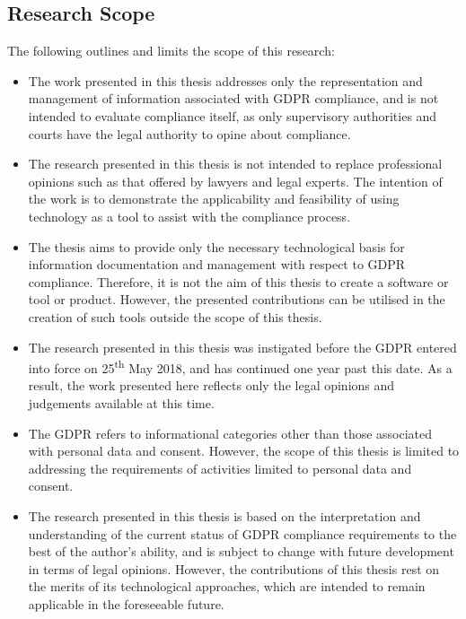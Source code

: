 \subsection{Research Scope}\label{sec:intro-scope}
The following outlines and limits the scope of this research:
\begin{itemize}
    \item The work presented in this thesis addresses only the representation and management of information associated with GDPR compliance, and is not intended to evaluate compliance itself, as only supervisory authorities and courts have the legal authority to opine about compliance.
    \item The research presented in this thesis is not intended to replace professional opinions such as that offered by lawyers and legal experts. The intention of the work is to demonstrate the applicability and feasibility of using technology as a tool to assist with the compliance process.
    \item The thesis aims to provide only the necessary technological basis for information documentation and management with respect to GDPR compliance. Therefore, it is not the aim of this thesis to create a software or tool or product. However, the presented contributions can be utilised in the creation of such tools outside the scope of this thesis.
    \item The research presented in this thesis was instigated before the GDPR entered into force on 25\textsuperscript{th} May 2018, and has continued one year past this date. As a result, the work presented here reflects only the legal opinions and judgements available at this time.
    \item The GDPR refers to informational categories other than those associated with personal data and consent. However, the scope of this thesis is limited to addressing the requirements of activities limited to personal data and consent.
    \item The research presented in this thesis is based on the interpretation and understanding of the current status of GDPR compliance requirements to the best of the author's ability, and is subject to change with future development in terms of legal opinions. However, the contributions of this thesis rest on the merits of its technological approaches, which are intended to remain applicable in the foreseeable future.
\end{itemize}

